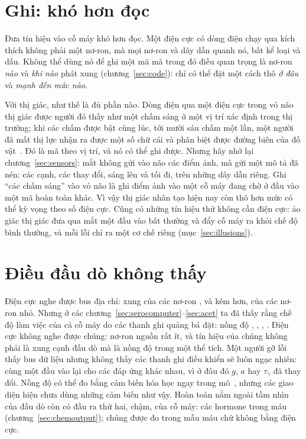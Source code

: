 \section{Ghi: khó hơn đọc}

Đưa tín hiệu vào cỗ máy khó hơn đọc. Một điện cực có dòng điện chạy qua kích thích không phải một nơ-ron, mà mọi nơ-ron và dây dẫn quanh nó, bất kể loại và dấu. Không thể dùng nó để ghi một mã mà trong đó điều quan trọng là nơ-ron \emph{nào} và \emph{khi nào} phát xung (chương~\ref{sec:code}): chỉ có thể đặt một cách thô \emph{ở đâu} và \emph{mạnh đến mức nào}.

Với thị giác, như thế là đủ phần nào. Dòng điện qua một điện cực trong vỏ não thị giác được người đó thấy như một chấm sáng ở một vị trí xác định trong thị trường; khi các chấm được bật cùng lúc, tới mười sáu chấm một lần, một người đã mất thị lực nhận ra được một số chữ cái và phân biệt được đường biên của đồ vật~\cite{Fernandez2021}. Đó là mã theo vị trí, và nó có thể ghi được. Nhưng hãy nhớ lại chương~\ref{sec:sensors}: mắt không gửi vào não các điểm ảnh, mà gửi một mô tả đã nén: các cạnh, các thay đổi, sáng lên và tối đi, trên những dây dẫn riêng. Ghi ``các chấm sáng'' vào vỏ não là ghi điểm ảnh vào một cỗ máy đang chờ ở đầu vào một mã hoàn toàn khác. Vì vậy thị giác nhân tạo hiện nay còn thô hơn mức có thể kỳ vọng theo số điện cực. Cũng có những tín hiệu thử không cần điện cực: ảo giác thị giác đưa qua mắt một đầu vào bất thường và đẩy cỗ máy ra khỏi chế độ bình thường, và mỗi lỗi chỉ ra một cơ chế riêng (mục~\ref{sec:illusions}).

\section{Điều đầu dò không thấy}

Điện cực nghe được bus địa chỉ: xung của các nơ-ron , và kém hơn, của các nơ-ron  nhỏ. Nhưng ở các chương~\ref{sec:serocomputer}--\ref{sec:acet} ta đã thấy rằng chế độ làm việc của cả cỗ máy do các thanh ghi quảng bá đặt: nồng độ , , , . Điện cực không nghe được chúng: nơ-ron nguồn rất ít, và tín hiệu của chúng không phải là xung cạnh đầu dò mà là nồng độ trong một thể tích. Một người gỡ lỗi thấy bus dữ liệu nhưng không thấy các thanh ghi điều khiển sẽ luôn ngạc nhiên: cùng một đầu vào lại cho các đáp ứng khác nhau, vì ở đâu đó $g$, $a$ hay $\tau_\gamma$ đã thay đổi. Nồng độ có thể đo bằng cảm biến hóa học ngay trong mô~\cite{Bunin1998}, nhưng các giao diện hiện chưa dùng những cảm biến như vậy. Hoàn toàn nằm ngoài tầm nhìn của đầu dò còn có đầu ra thứ hai, chậm, của cỗ máy: các hormone trong máu (chương~\ref{sec:chemoutput}); chúng được đo trong mẫu máu chứ không bằng điện cực.

